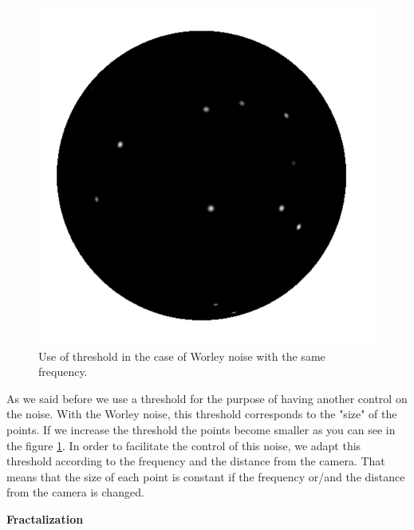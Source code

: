 \begin{figure}[H]
\begin{center}
    \includegraphics[scale=0.3]{images/noise/worley3d_thresh_3.png}
    \end{center}
    \caption{Use of threshold in the case of Worley noise with the same frequency.}
    \label{worley_threshold}
\end{figure}

As we said before we use a threshold for the purpose of having another control on the noise. With the Worley noise, this threshold corresponds to the "size" of the points. If we increase the threshold the points become smaller as you can see in the figure \ref{worley_threshold}. In order to facilitate the control of this noise, we adapt this threshold according to the frequency and the distance from the camera. That means that the size of each point is constant if the frequency or/and the distance from the camera is changed. \newline



\textbf{Fractalization}

